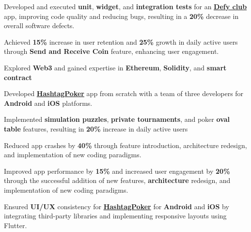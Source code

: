 \documentclass[]{deedy-resume-openfont}
\begin{document}
\begin{minipage}[t]{0.66\textwidth}
\vspace{\topsep} %
\begin{tightemize}
\item Developed and executed {\bf unit}, {\bf widget}, and {\bf integration tests} for an \href{https://defy.club}{\bf Defy club} app, improving code quality and reducing bugs, resulting in a {\bf 20\%} decrease in overall software defects.
\item Achieved {\bf 15\%} increase in user retention and {\bf 25\%} growth in daily active users through {\bf Send and Receive Coin} feature, enhancing user engagement.
\item Explored {\bf Web3} and gained expertise in {\bf Ethereum}, {\bf Solidity}, and {\bf smart contract}
\end{tightemize}
\sectionsep

\begin{tightemize}
\item Developed \href{https://play.google.com/store/apps/details?id=com.hashtag.poker.app}{\bf HashtagPoker} app from scratch with a team of three developers for {\bf Android} and {\bf iOS} platforms.
\item Implemented {\bf simulation puzzles}, {\bf private tournaments}, and poker {\bf oval table} features, resulting in {\bf 20\%} increase in daily active users
\item Reduced app crashes by {\bf 40\%} through feature introduction, architecture redesign, and implementation of new coding paradigms.
\item Improved app performance by {\bf 15\%} and increased user engagement by {\bf 20\%} through the successful addition of new features, {\bf architecture} redesign, and implementation of new coding paradigms.

\end{tightemize}
\sectionsep

\begin{tightemize}
\item Ensured {\bf UI/UX} consistency for \href{https://play.google.com/store/apps/details?id=com.hashtag.poker.app}{\bf HashtagPoker} for {\bf Android} and {\bf iOS} by integrating third-party libraries and implementing responsive layouts using Flutter.
\end{tightemize}
\sectionsep


\end{minipage}
\end{document}
